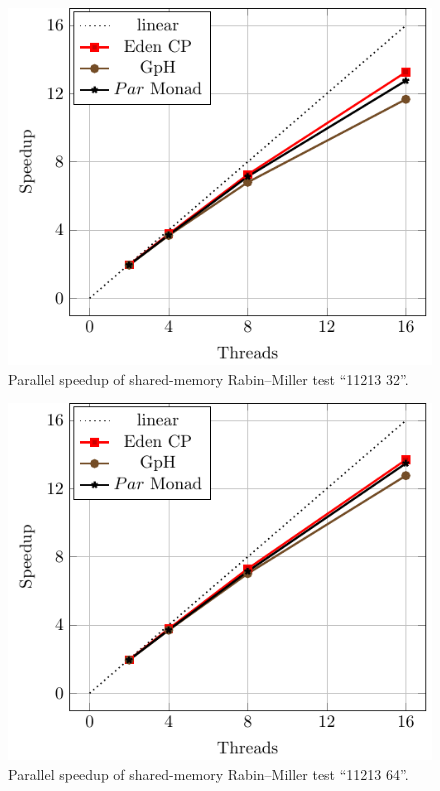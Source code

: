 \documentclass[paper=A4,twoside=true,openright,parskip=full,chapterprefix=true,headings=normal,bibliography=totoc,listof=totoc,titlepage=on,captions=tableabove,draft=false,british]{scrreprt}%
\renewcommand{\enquote}[1]{{``}#1{''}}
\begin{document}
\begin{figure}[h]
\centering
\includegraphics{src/img/perfSMRM32.pdf}
\caption{Parallel speedup of shared-memory Rabin--Miller test
\enquote{11213 32}.\label{fig:perfSMRM32}}
\end{figure}

\vfill

\begin{figure}[h]
\centering
\includegraphics{src/img/perfSMRM64.pdf}
\caption{Parallel speedup of shared-memory Rabin--Miller test
\enquote{11213 64}.\label{fig:perfSMRM64}}
\end{figure}
\end{document}
